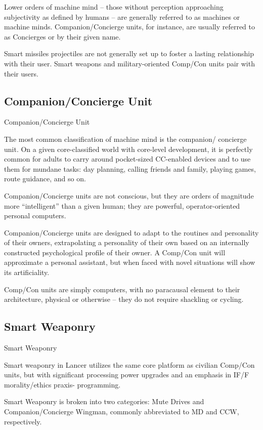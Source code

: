 Lower orders of machine mind -- those without perception approaching subjectivity as defined
by humans -- are generally referred to as machines or machine minds. Companion/Concierge
units, for instance, are usually referred to as Concierges or by their given name.


Smart missiles projectiles are not generally set up to foster a lasting relationship with their user.
Smart weapons and military-oriented Comp/Con units pair with their users.

\subsection{Companion/Concierge Unit}
Companion/Concierge Unit

The most common classification of machine mind is the companion/ concierge unit. On a given
core-classified world with core-level development, it is perfectly common for adults to carry
around pocket-sized CC-enabled devices and to use them for mundane tasks: day planning,
calling friends and family, playing games, route guidance, and so on.


Companion/Concierge units are not conscious, but they are orders of magnitude more
“intelligent” than a given human; they are powerful, operator-oriented personal computers.


Companion/Concierge units are designed to adapt to the routines and personality of their
owners, extrapolating a personality of their own based on an internally constructed psychological
profile of their owner. A Comp/Con unit will approximate a personal assistant, but when faced
with novel situations will show its artificiality.


Comp/Con units are simply computers, with no paracausal element to their architecture, physical
or otherwise -- they do not require shackling or cycling.



\subsection{Smart Weaponry  }

Smart Weaponry

Smart weaponry in Lancer utilizes the same core platform as civilian Comp/Con units, but with
significant processing power upgrades and an emphasis in IF/F morality/ethics praxis-
programming.


Smart Weaponry is broken into two categories: Mute Drives and Companion/Concierge
Wingman, commonly abbreviated to MD and CCW, respectively.


